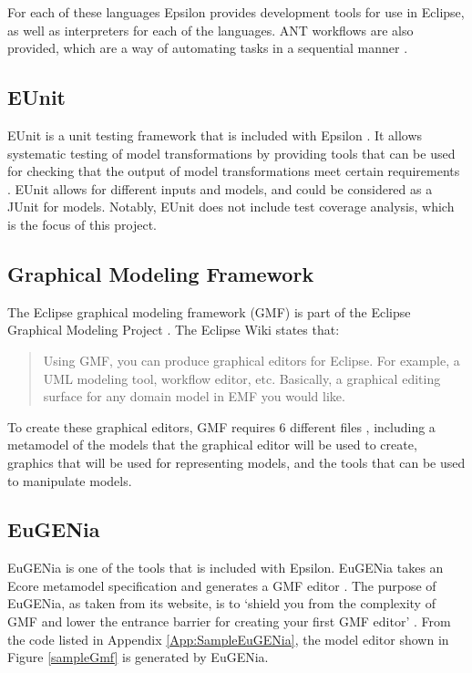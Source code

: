 For each of these languages Epsilon provides development tools for use in Eclipse, as well as interpreters for each of the languages. ANT workflows are also provided, which are a way of automating tasks in a sequential manner \citep{epsilonBook}.

\subsection{EUnit}
EUnit is a unit testing framework that is included with Epsilon \citep{epsilonWebsite}. It allows systematic testing of model transformations by providing tools that can be used for checking that the output of model transformations meet certain requirements \citep{epsilonBook}. EUnit allows for different inputs and models, and could be considered as a JUnit for models. Notably, EUnit does not include test coverage analysis, which is the focus of this project.

\subsection{Graphical Modeling Framework}

The Eclipse graphical modeling framework (GMF) is part of the Eclipse Graphical Modeling Project \citep{gmpSite}. The Eclipse Wiki \cite{gmpFAQ} states that:

\begin{quote} Using GMF, you can produce graphical editors for Eclipse. For example, a UML modeling tool, workflow editor, etc. Basically, a graphical editing surface for any domain model in EMF you would like. \end{quote}

To create these graphical editors, GMF requires 6 different files \citep{gmfIntro}, including a metamodel of the models that the graphical editor will be used to create, graphics that will be used for representing models, and the tools that can be used to manipulate models.

\subsection{EuGENia}
EuGENia is one of the tools that is included with Epsilon. EuGENia takes an Ecore metamodel specification and generates a GMF editor \citep{eugeniaSite}. The purpose of EuGENia, as taken from its website, is to `shield you from the complexity of GMF and lower the entrance barrier for creating your first GMF editor' \citep{eugeniaSite}. From the code listed in Appendix \ref{App:SampleEuGENia}, the model editor shown in Figure \ref{sampleGmf} is generated by EuGENia.

